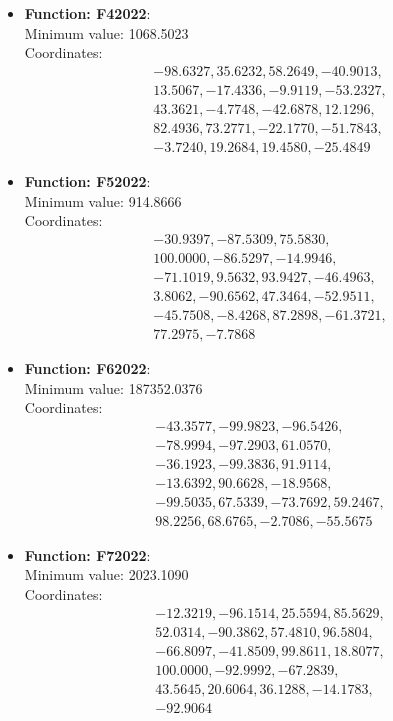 \documentclass{article}
\begin{document}
\begin{itemize}
  \item \textbf{Function: F42022}: \\
    Minimum value: 1068.5023 \\
    Coordinates:
    \[
      \begin{aligned}
        & -98.6327, 35.6232, 58.2649, -40.9013, \\
        & 13.5067, -17.4336, -9.9119, -53.2327, \\
        & 43.3621, -4.7748, -42.6878, 12.1296, \\
        & 82.4936, 73.2771, -22.1770, -51.7843, \\
        & -3.7240, 19.2684, 19.4580, -25.4849
      \end{aligned}
    \]

  \item \textbf{Function: F52022}: \\
    Minimum value: 914.8666 \\
    Coordinates:
    \[
      \begin{aligned}
        & -30.9397, -87.5309, 75.5830, \\
        & 100.0000, -86.5297, -14.9946, \\
        & -71.1019, 9.5632, 93.9427, -46.4963, \\
        & 3.8062, -90.6562, 47.3464, -52.9511, \\
        & -45.7508, -8.4268, 87.2898, -61.3721, \\
        & 77.2975, -7.7868
      \end{aligned}
    \]

  \item \textbf{Function: F62022}: \\
    Minimum value: 187352.0376 \\
    Coordinates:
    \[
      \begin{aligned}
        & -43.3577, -99.9823, -96.5426, \\
        & -78.9994, -97.2903, 61.0570, \\
        & -36.1923, -99.3836, 91.9114, \\
        & -13.6392, 90.6628, -18.9568, \\
        & -99.5035, 67.5339, -73.7692, 59.2467, \\
        & 98.2256, 68.6765, -2.7086, -55.5675
      \end{aligned}
    \]

  \item \textbf{Function: F72022}: \\
    Minimum value: 2023.1090 \\
    Coordinates:
    \[
      \begin{aligned}
        & -12.3219, -96.1514, 25.5594, 85.5629, \\
        & 52.0314, -90.3862, 57.4810, 96.5804, \\
        & -66.8097, -41.8509, 99.8611, 18.8077, \\
        & 100.0000, -92.9992, -67.2839, \\
        & 43.5645, 20.6064, 36.1288, -14.1783, \\
        & -92.9064
      \end{aligned}
    \]


\end{itemize}
\end{document}
